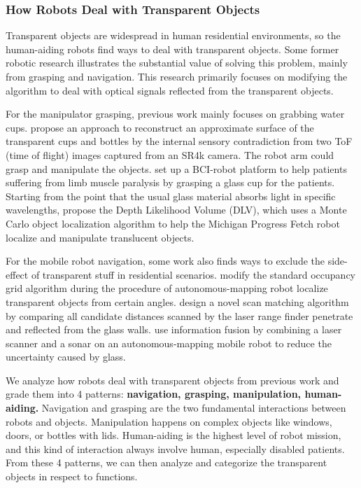 \documentclass{article}
\begin{document}
\subsubsection{How Robots Deal with Transparent Objects}
Transparent objects are widespread in human residential environments, so the human-aiding robots find ways to deal with transparent objects. Some former robotic research illustrates the substantial value of solving this problem, mainly from grasping and navigation. This research primarily focuses on modifying the algorithm to deal with optical signals reflected from the transparent objects.

For the manipulator grasping, previous work mainly focuses on grabbing water cups.
\cite{detandrecon} propose an approach to reconstruct an approximate surface of the transparent cups and bottles by the internal sensory contradiction from two ToF (time of flight) images captured from an SR4k camera. The robot arm could grasp and manipulate the objects.
\cite{reachandgrasp} set up a BCI-robot platform to help patients suffering from limb muscle paralysis by grasping a glass cup for the patients. 
Starting from the point that the usual glass material absorbs light in specific wavelengths,
\cite{iros2018} propose the Depth Likelihood Volume (DLV), which uses a Monte Carlo object localization algorithm to help the Michigan Progress Fetch robot localize and manipulate translucent objects.

For the mobile robot navigation, some work also finds ways to exclude the side-effect of transparent stuff in residential scenarios.
\cite{icra2013} modify the standard occupancy grid algorithm during the procedure of autonomous-mapping robot localize transparent objects from certain angles.
\cite{laserfinder} design a novel scan matching algorithm by comparing all candidate distances scanned by the laser range finder penetrate and reflected from the glass walls.
\cite{multidata} use information fusion by combining a laser scanner and a sonar on an autonomous-mapping mobile robot to reduce the uncertainty caused by glass. 

We analyze how robots deal with transparent objects from previous work and grade them into 4 patterns:
\textbf{navigation, grasping, manipulation, human-aiding.}
Navigation and grasping are the two fundamental interactions between robots and objects. Manipulation happens on complex objects like windows, doors, or bottles with lids.
Human-aiding is the highest level of robot mission, and this kind of interaction always involve human, especially disabled patients.
From these 4 patterns, we can then analyze and categorize the transparent objects in respect to functions.
\end{document}
